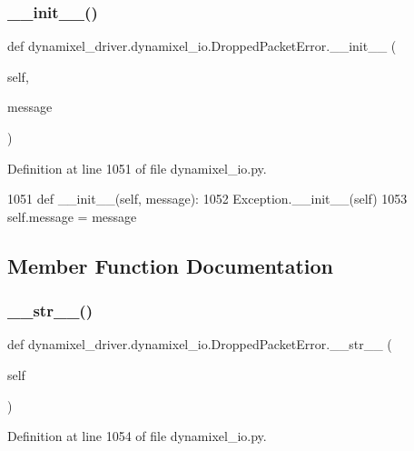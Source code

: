 \subsubsection{\texorpdfstring{\+\_\+\+\_\+init\+\_\+\+\_\+()}{\_\_init\_\_()}}
{\footnotesize\ttfamily def dynamixel\+\_\+driver.\+dynamixel\+\_\+io.\+Dropped\+Packet\+Error.\+\_\+\+\_\+init\+\_\+\+\_\+ (\begin{DoxyParamCaption}\item[{}]{self,  }\item[{}]{message }\end{DoxyParamCaption})}



Definition at line 1051 of file dynamixel\+\_\+io.\+py.


\begin{DoxyCode}
1051     \textcolor{keyword}{def }\_\_init\_\_(self, message):
1052         Exception.\_\_init\_\_(self)
1053         self.message = message
\end{DoxyCode}


\subsection{Member Function Documentation}
\mbox{\label{classdynamixel__driver_1_1dynamixel__io_1_1_dropped_packet_error_a07915193cc4b903f46fbc3db27d0f7d4}} 
\subsubsection{\texorpdfstring{\+\_\+\+\_\+str\+\_\+\+\_\+()}{\_\_str\_\_()}}
{\footnotesize\ttfamily def dynamixel\+\_\+driver.\+dynamixel\+\_\+io.\+Dropped\+Packet\+Error.\+\_\+\+\_\+str\+\_\+\+\_\+ (\begin{DoxyParamCaption}\item[{}]{self }\end{DoxyParamCaption})}



Definition at line 1054 of file dynamixel\+\_\+io.\+py.



